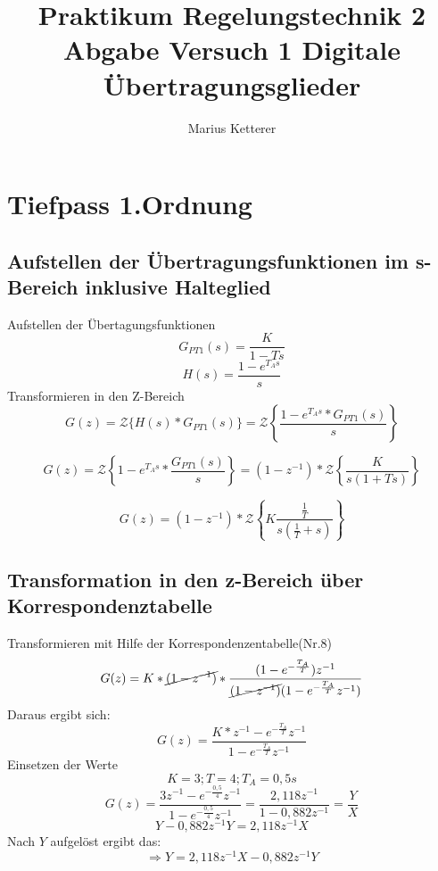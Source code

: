 \documentclass[12pt,a4paper]{report}
\author{Marius Ketterer}
\title{Praktikum Regelungstechnik 2 Abgabe Versuch 1 Digitale Übertragungsglieder}
\begin{document}
\maketitle
\tableofcontents

\chapter{Tiefpass 1.Ordnung}
\section{Aufstellen der Übertragungsfunktionen im s-Bereich inklusive Halteglied}
Aufstellen der Übertagungsfunktionen
\begin{equation}
G_{PT1}(s) = \frac{K}{1-Ts} 
\end{equation}
\begin{equation}
H(s) = \frac{1-e^{T_As}}{s}
\end{equation}
Transformieren in den Z-Bereich
\begin{equation}
G(z) = \mathcal{Z}\{H(s)*G_{PT1}(s)\} = \mathcal{Z}\left\{\frac{1-e^{T_As}* G_{PT1}(s)}{s}\right\}
\end{equation}

\begin{equation}
G(z) = \mathcal{Z}\left\{1-e^{T_As}*\frac{G_{PT1}(s)}{s}\right\} = (1-z^{-1})*\mathcal{Z}\left\{\frac{K}{s(1+Ts)}\right\}
\end{equation}

\begin{equation}
G(z) = (1-z^{-1})*\mathcal{Z}\left\{K\frac{\frac{1}{T}}{s(\frac{1}{T}+s)}\right\}
\end{equation}
\section{Transformation in den z-Bereich über Korrespondenztabelle}
Transformieren mit Hilfe der Korrespondenzentabelle(Nr.8)
\begin{equation}
G(z) = K*\cancel{(1-z^{-1})}*
\frac{(1-e^{-\frac{T_A}{T}})z^{-1}}
{\cancel{(1-z^{-1})}(1-e^{-\frac{T_A}{T}}z^{-1})}
\end{equation}
Daraus ergibt sich: 
\begin{equation}
G(z) = \frac{K*z^{-1}-e^{-\frac{T_A}{T}}z^{-1}}
{1-e^{-\frac{T_A}{T}}z^{-1}} 
\end{equation}
Einsetzen der Werte
\begin{equation}
K = 3; T = 4; T_A = 0,5s
\end{equation}
\begin{equation}
G(z) = \frac{3z^{-1}-e^{-\frac{0,5}{4}}z^{-1}}
{1-e^{-\frac{0,5}{4}}z^{-1}} = \frac{2,118z^{-1}}{1-0,882z^{-1}} = \frac{Y}{X}
\end{equation}
\begin{equation}
 Y- 0,882z^{-1}Y = 2,118z^{-1}X
\end{equation}
Nach $ Y $ aufgelöst ergibt das:
\begin{equation}
\Rightarrow Y = 2,118z^{-1}X - 0,882z^{-1}Y
\end{equation}
\end{document}

